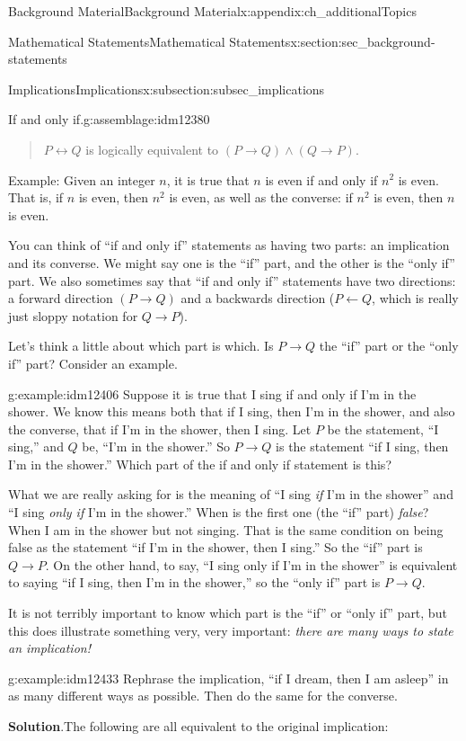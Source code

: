 \documentclass[oneside,10pt,]{book}
\numberwithin{equation}{chapter}
\def\iff{\leftrightarrow}
\def\imp{\rightarrow}
\begin{document}
\begin{appendixptx}{Background Material}{}{Background Material}{}{}{x:appendix:ch_additionalTopics}
\begin{sectionptx}{Mathematical Statements}{}{Mathematical Statements}{}{}{x:section:sec_background-statements}
\begin{subsectionptx}{Implications}{}{Implications}{}{}{x:subsection:subsec_implications}
\begin{assemblage}{If and only if.}{g:assemblage:idm12380}
\begin{quote}%
\(P \iff Q\) is logically equivalent to \((P \imp Q) \wedge (Q \imp P)\).%
\end{quote}
Example: Given an integer \(n\), it is true that \(n\) is even if and only if \(n^2\) is even. That is, if \(n\) is even, then \(n^2\) is even, as well as the converse: if \(n^2\) is even, then \(n\) is even.%
\end{assemblage}
You can think of ``if and only if'' statements as having two parts: an implication and its converse. We might say one is the ``if'' part, and the other is the ``only if'' part. We also sometimes say that ``if and only if'' statements have two directions: a forward direction \((P \imp Q)\) and a backwards direction (\(P \leftarrow Q\), which is really just sloppy notation for \(Q \imp P\)).%
\par
Let's think a little about which part is which. Is \(P \imp Q\) the ``if'' part or the ``only if'' part? Consider an example.%
\begin{example}{}{g:example:idm12406}%
Suppose it is true that I sing if and only if I'm in the shower. We know this means both that if I sing, then I'm in the shower, and also the converse, that if I'm in the shower, then I sing. Let \(P\) be the statement, ``I sing,'' and \(Q\) be, ``I'm in the shower.'' So \(P \imp Q\) is the statement ``if I sing, then I'm in the shower.'' Which part of the if and only if statement is this?%
\par
What we are really asking for is the meaning of ``I sing \emph{if} I'm in the shower'' and ``I sing \emph{only if} I'm in the shower.'' When is the first one (the ``if'' part) \emph{false}? When I am in the shower but not singing. That is the same condition on being false as the statement ``if I'm in the shower, then I sing.'' So the ``if'' part is \(Q \imp P\). On the other hand, to say, ``I sing only if I'm in the shower'' is equivalent to saying ``if I sing, then I'm in the shower,'' so the ``only if'' part is \(P \imp Q\).%
\end{example}
It is not terribly important to know which part is the ``if'' or ``only if'' part, but this does illustrate something very, very important: \emph{there are many ways to state an implication!}%
\begin{example}{}{g:example:idm12433}%
Rephrase the implication, ``if I dream, then I am asleep'' in as many different ways as possible. Then do the same for the converse.%
\par\smallskip%
\noindent\textbf{Solution}.\hypertarget{g:solution:idm12437}{}\quad{}The following are all equivalent to the original implication:%

\end{example}
\end{subsectionptx}
\end{sectionptx}
\end{appendixptx}
\end{document}
